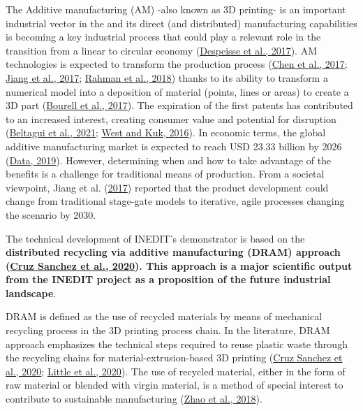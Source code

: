\documentclass[
  11pt,
]{article}
\begin{document}
The Additive manufacturing (AM) -also known as 3D printing- is an
important industrial vector in the and its direct (and distributed)
manufacturing capabilities is becoming a key industrial process that
could play a relevant role in the transition from a linear to circular
economy (\protect\hyperlink{ref-Despeisse2016}{Despeisse et al., 2017}).
AM technologies is expected to transform the production process
(\protect\hyperlink{ref-Chen2017}{Chen et al., 2017};
\protect\hyperlink{ref-Jiang2017}{Jiang et al., 2017};
\protect\hyperlink{ref-Rahman2018}{Rahman et al., 2018}) thanks to its
ability to transform a numerical model into a deposition of material
(points, lines or areas) to create a 3D part
(\protect\hyperlink{ref-Bourell2017}{Bourell et al., 2017}). The
expiration of the first patents has contributed to an increased
interest, creating consumer value and potential for disruption
(\protect\hyperlink{ref-Beltagui2020}{Beltagui et al., 2021};
\protect\hyperlink{ref-West2016a}{West and Kuk, 2016}). In economic
terms, the global additive manufacturing market is expected to reach USD
23.33 billion by 2026 (\protect\hyperlink{ref-ReportsAndData2019}{Data,
2019}). However, determining when and how to take advantage of the
benefits is a challenge for traditional means of production. From a
societal viewpoint, Jiang et al.
(\protect\hyperlink{ref-Jiang2017}{2017}) reported that the product
development could change from traditional stage-gate models to
iterative, agile processes changing the scenario by 2030.

The technical development of INEDIT's demonstrator is based on the
\textbf{distributed recycling via additive manufacturing (DRAM) approach
(\protect\hyperlink{ref-CruzSanchez2020}{Cruz Sanchez et al., 2020}).
This approach is a major scientific output from the INEDIT project as a
proposition of the future industrial landscape}.

DRAM is defined as the use of recycled materials by means of mechanical
recycling process in the 3D printing process chain. In the literature,
DRAM approach emphasizes the technical steps required to reuse plastic
waste through the recycling chains for material-extrusion-based 3D
printing (\protect\hyperlink{ref-CruzSanchez2020}{Cruz Sanchez et al.,
2020}; \protect\hyperlink{ref-Little2020}{Little et al., 2020}). The use
of recycled material, either in the form of raw material or blended with
virgin material, is a method of special interest to contribute to
sustainable manufacturing (\protect\hyperlink{ref-Zhao2018}{Zhao et al.,
2018}).
\end{document}
